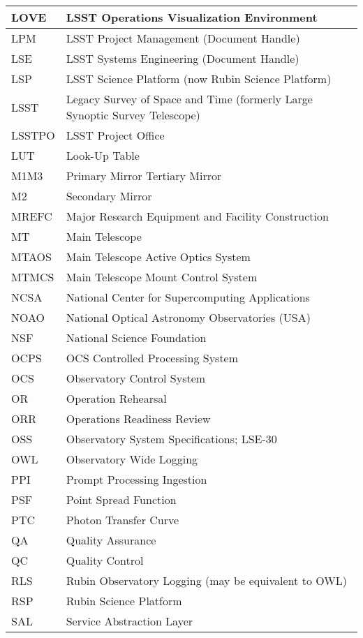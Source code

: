 \begin{longtable}{p{}p{}}
LOVE & LSST Operations Visualization Environment \\\hline
LPM & LSST Project Management (Document Handle) \\\hline
LSE & LSST Systems Engineering (Document Handle) \\\hline
LSP & LSST Science Platform (now Rubin Science Platform) \\\hline
LSST & Legacy Survey of Space and Time (formerly Large Synoptic Survey Telescope) \\\hline
LSSTPO & LSST Project Office \\\hline
LUT & Look-Up Table \\\hline
M1M3 & Primary Mirror Tertiary Mirror \\\hline
M2 & Secondary Mirror \\\hline
MREFC & Major Research Equipment and Facility Construction \\\hline
MT & Main Telescope \\\hline
MTAOS & Main Telescope Active Optics System \\\hline
MTMCS & Main Telescope Mount Control System \\\hline
NCSA & National Center for Supercomputing Applications \\\hline
NOAO & National Optical Astronomy Observatories (USA) \\\hline
NSF & National Science Foundation \\\hline
OCPS & OCS Controlled Processing System \\\hline
OCS & Observatory Control System \\\hline
OR & Operation Rehearsal \\\hline
ORR & Operations Readiness Review \\\hline
OSS & Observatory System Specifications; LSE-30 \\\hline
OWL & Observatory Wide Logging \\\hline
PPI & Prompt Processing Ingestion \\\hline
PSF & Point Spread Function \\\hline
PTC & Photon Transfer Curve \\\hline
QA & Quality Assurance \\\hline
QC & Quality Control \\\hline
RLS & Rubin Observatory Logging (may be equivalent to OWL) \\\hline
RSP & Rubin Science Platform \\\hline
SAL & Service Abstraction Layer \\\hline

\end{longtable}

